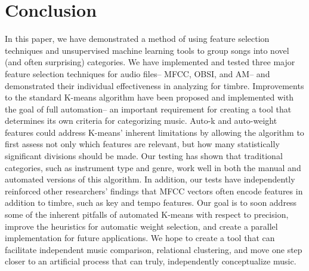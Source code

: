 \documentclass[12pt,twocolumn,titlepage]{article}
\begin{document}
\section{Conclusion}
\label{sec:conclusion}

In this paper, we have demonstrated a method of using feature selection techniques and unsupervised machine learning tools to group songs into novel (and often surprising) categories. We have implemented and tested three major feature selection techniques for audio files-- MFCC, OBSI, and AM-- and demonstrated their individual effectiveness in analyzing for timbre. Improvements to the standard K-means algorithm have been proposed and implemented with the goal of full automation-- an important requirement for creating a tool that determines its own criteria for categorizing music. Auto-k and auto-weight features could address K-means' inherent limitations by allowing the algorithm to first assess not only which features are relevant, but how many statistically significant divisions should be made. Our testing has shown that traditional categories, such as instrument type and genre, work well in both the manual and automated versions of this algorithm. In addition, our tests have independently reinforced other researchers' findings that MFCC vectors often encode features in addition to timbre, such as key and tempo features. Our goal is to soon address some of the inherent pitfalls of automated K-means with respect to precision, improve the heuristics for automatic weight selection, and create a parallel implementation for future applications. We hope to create a tool that can facilitate independent music comparison, relational clustering, and move one step closer to an artificial process that can truly, independently conceptualize music.






\end{document}
